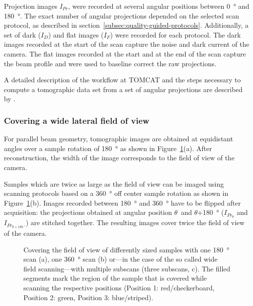 Projection images $I_{Pr}$, were recorded at several angular positions between \SI{0}{\degree} and \SI{180}{\degree}. The exact number of angular projections depended on the selected scan protocol, as described in section~\ref{subsec:quality-guided-protocols}. Additionally, a set of dark ($I_{D}$) and flat images ($I_{F}$) were recorded for each protocol. The dark images recorded at the start of the scan capture the noise and dark current of the camera. The flat images recorded at the start and at the end of the scan capture the beam profile and were used to baseline correct the raw projections.

A detailed description of the workflow at TOMCAT and the steps necessary to compute a tomographic data set from a set of angular projections are described by 
\ifhtml
	\citet{Hintermueller2009}
\else
\fi%
.

\subsubsection{Covering a wide lateral field of view}
For parallel beam geometry, tomographic images are obtained at equidistant angles over a sample rotation of \SI{180}{\degree} as shown in Figure~\ref{fig:scanning-possibilities}(a). After reconstruction, the width of the image corresponds to the field of view of the camera.

Samples which are twice as large as the field of view can be imaged using scanning protocols based on a \SI{360}{\degree} off center sample rotation as shown in Figure~\ref{fig:scanning-possibilities}(b). Images recorded between \SI{180}{\degree} and \SI{360}{\degree} have to be flipped after acquisition: the projections obtained at angular position $\theta$\ and $\theta$+\SI{180}{\degree} ($I_{Pr_{\theta}}$ and $I_{Pr_{\theta+\SI{180}{\degree}}}$) are stitched together. The resulting images cover twice the field of view of the camera.

\begin{figure}
	\centering
	\caption{Covering the field of view of differently sized samples with one \SI{180}{\degree} scan (a), one \SI{360}{\degree} scan (b) or---in the case of the so called wide field scanning---with multiple subscans (three subscans, c). The filled segments mark the region of the sample that is covered while scanning the respective positions (Position 1: red/checkerboard, Position 2: green, Position 3: blue/striped).}%
	\ifiucr		
	\else
	\fi
	\label{fig:scanning-possibilities}%
\end{figure}


